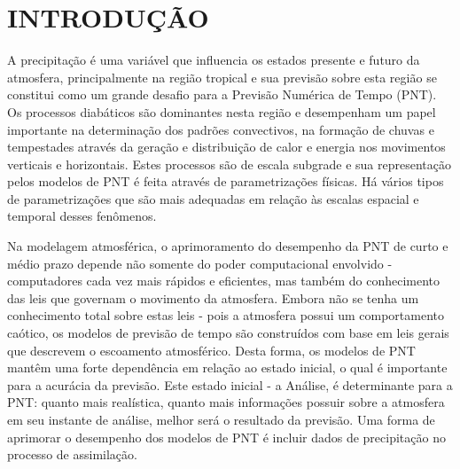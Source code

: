 \hypertarget{estilo:capitulo}{}
\chapter{INTRODUÇÃO} 

A precipitação é uma variável que influencia os estados presente e futuro da atmosfera,  principalmente na região tropical e sua previsão sobre esta região  se constitui como um grande desafio para a Previsão Numérica de Tempo (PNT). Os processos diabáticos são dominantes nesta região e desempenham um papel importante na determinação dos padrões convectivos, na formação de chuvas e tempestades através da geração e distribuição de calor e energia nos movimentos verticais e horizontais. Estes processos são de escala subgrade e sua representação pelos modelos de PNT é feita através de parametrizações  físicas. Há vários tipos de parametrizações que são mais adequadas em relação às escalas espacial e temporal desses fenômenos.

Na modelagem atmosférica, o aprimoramento do desempenho da PNT de curto e médio prazo depende não somente do poder computacional envolvido - computadores cada vez mais rápidos e eficientes, mas também do conhecimento das leis que governam o movimento da atmosfera. Embora não se tenha um conhecimento total sobre estas leis - pois a atmosfera possui um comportamento caótico, os modelos de previsão de tempo são construídos com base em leis gerais que descrevem o escoamento atmosférico. Desta forma, os modelos de PNT mantêm uma forte dependência em relação ao estado inicial, o qual é importante para a acurácia da previsão. Este estado inicial - a Análise, é determinante para a PNT: quanto mais realística, quanto mais informações possuir sobre a atmosfera em seu instante de análise, melhor será o resultado da previsão. Uma forma de aprimorar o desempenho dos modelos de PNT é incluir dados de precipitação no processo de assimilação.

